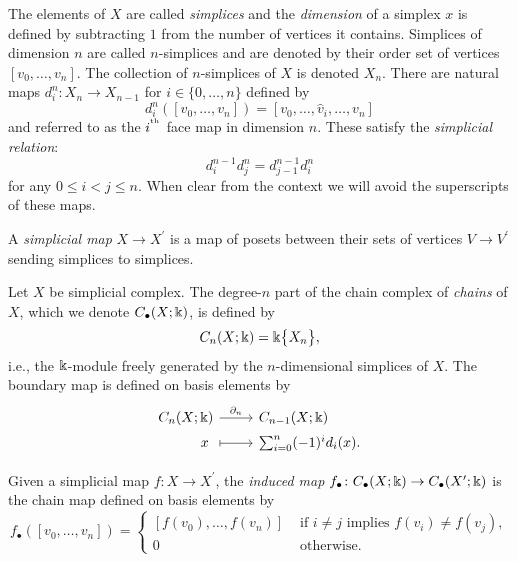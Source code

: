 The elements of $X$ are called \textit{simplices} and the \textit{dimension} of a simplex $x$ is defined by subtracting $1$ from the number of vertices it contains.
Simplices of dimension $n$ are called $n$-simplices and are denoted by their order set of vertices $[v_0, \dots, v_n]$.
The collection of $n$-simplices of $X$ is denoted $X_n$.
There are natural maps $d_i^n \colon X_n \to X_{n-1}$ for $i \in \{0, \dots, n\}$ defined by
\begin{equation*}
d_i^n([v_0, \dots, v_n]) = [v_0, \dots, \widehat{v}_i, \dots, v_n]
\end{equation*}
and referred to as the $i^{^\mathrm{th}}$ face map in dimension $n$.
These satisfy the \textit{simplicial relation}:
\begin{equation} \label{e:simplicial relation}
d_i^{n-1} d^n_j = d_{j-1}^{n-1} d_i^n
\end{equation}
for any $0 \leq i < j \leq n$.
When clear from the context we will avoid the superscripts of these maps.

A \textit{simplicial map} $X \to X^\prime$ is a map of posets between their sets of vertices $V \to V^\prime$ sending simplices to simplices.

Let $X$ be simplicial complex.
The degree-$n$ part of the chain complex of \textit{chains} of $X$, which we denote $C_\bullet(X; \Bbbk)$, is defined by
\begin{equation*}
C_n(X; \Bbbk) = \Bbbk \big\{ X_n \big\},
\end{equation*}
i.e., the $\Bbbk$-module freely generated by the $n$-dimensional simplices of $X$.
The boundary map is defined on basis elements by
\begin{equation*}
\begin{tikzcd}[column sep=normal, row sep=tiny,row sep = 0ex
,/tikz/column 1/.append style={anchor=base east}
,/tikz/column 2/.append style={anchor=base west}
]
C_n(X; \k) \arrow[r, "\partial_n"] & C_{n-1}(X; \k) \\
x\ \arrow[r, |->] & \sum_{i=0}^{n} (-1)^i d_i (x).
\end{tikzcd}
\end{equation*}

Given a simplicial map $f \colon X \to X^\prime$, the \textit{induced map} $f_\bullet \colon C_\bullet(X; \Bbbk) \to C_\bullet(X^\prime; \Bbbk)$ is the chain map defined on basis elements by
\begin{equation*}
f_\bullet([v_0, \dots, v_n]) =
\begin{cases}
[f(v_0), \dots, f(v_n)] & \text{ if } i \neq j \text{ implies } f(v_i) \neq f(v_j), \\
0 & \text{ otherwise}.
\end{cases}
\end{equation*}

